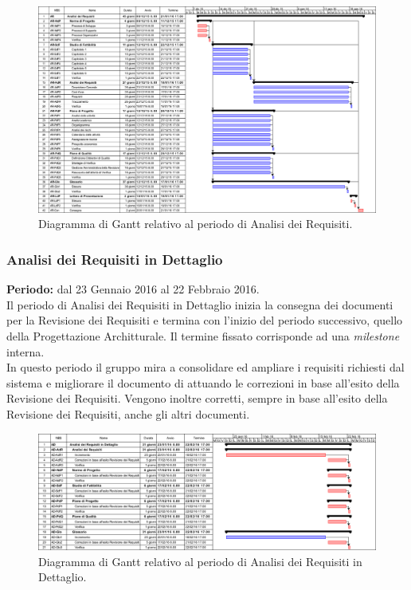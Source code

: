 \begin{figure}
	\centering
	\includegraphics[keepaspectratio = true, width=23cm]{immagini/PdP_AnalisiDeiRequisitiGantt.png}
	\caption{Diagramma di Gantt relativo al periodo di Analisi dei Requisiti.}\label{etichetta}
\end{figure}
\newpage
\subsubsection{Analisi dei Requisiti in Dettaglio}
\textbf{Periodo:} dal 23 Gennaio 2016 al 22 Febbraio 2016. \\
Il periodo di Analisi dei Requisiti in Dettaglio inizia la consegna dei documenti per la Revisione dei Requisiti e termina con l'inizio del periodo successivo, quello della Progettazione Architturale. Il termine fissato corrisponde ad una \textit{milestone} interna. \\
In questo periodo il gruppo mira a consolidare ed ampliare i requisiti richiesti dal sistema e migliorare il documento di \AdR attuando le correzioni in base all'esito della Revisione dei Requisiti.
Vengono inoltre corretti, sempre in base all'esito della Revisione dei Requisiti, anche gli altri documenti. 
\begin{figure}[h]
	\centering
	\includegraphics[keepaspectratio = true, width=16cm]{immagini/PdP_AnalisiDeiRequisitiInDettaglioGantt.png}
	\caption{Diagramma di Gantt relativo al periodo di Analisi dei Requisiti in Dettaglio.}\label{etichetta}
\end{figure}
